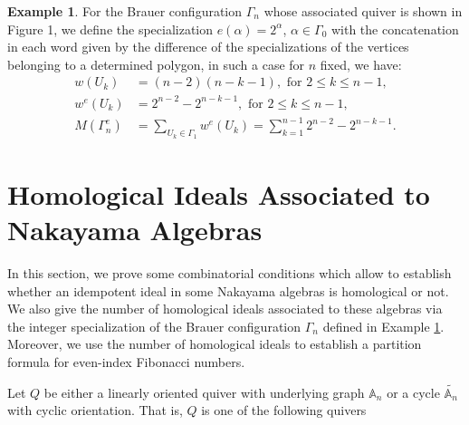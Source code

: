 \documentclass[10pt,twoside]{article}
\theoremstyle{definition}
\newtheorem{exam}{Example}
\begin{document}
\addtocounter{exam}{8}
\begin{exam}\label{integerspecialization}
For the Brauer configuration $\Gamma_n$ whose associated quiver is shown in Figure 1, we define the specialization $e(\alpha)=2^{\alpha}$, $\alpha\in\Gamma_{0}$ with the concatenation in each word given by the difference of the specializations of the vertices belonging to a determined polygon, in such a case for $n$ fixed, we have:
\begin{equation}
\begin{split}
w(U_k)&=(n-2)(n-k-1), \text{ for } 2\leq k \leq n-1,\\
w^e(U_k)&=2^{n-2}-2^{n-k-1},\text{ for } 2\leq k \leq n-1,\\
M(\Gamma_n^e)&=\underset{U_k\in\Gamma_{1}}{\sum}w^{e}(U_k)=\sum_{k=1}^{n-1} 2^{n-2}-2^{n-k-1}.
\end{split}
\end{equation}  
\end{exam}





\section{Homological Ideals Associated to Nakayama Algebras}
In this section, we prove some combinatorial conditions which allow to establish whether an idempotent ideal in some Nakayama algebras is homological or not. We also give the number of homological ideals associated to these algebras via the integer specialization of the Brauer configuration $\Gamma_n$ defined in Example \ref{integerspecialization}. Moreover, we use the number of homological ideals to establish a partition formula for even-index Fibonacci numbers.\par\smallskip

Let $Q$ be either a linearly oriented quiver with underlying graph $\mathbb{A}_n$ or a cycle $\widetilde{\mathbb{A}_n}$ with cyclic
orientation. That is, $Q$ is one of the following quivers
\end{document}
